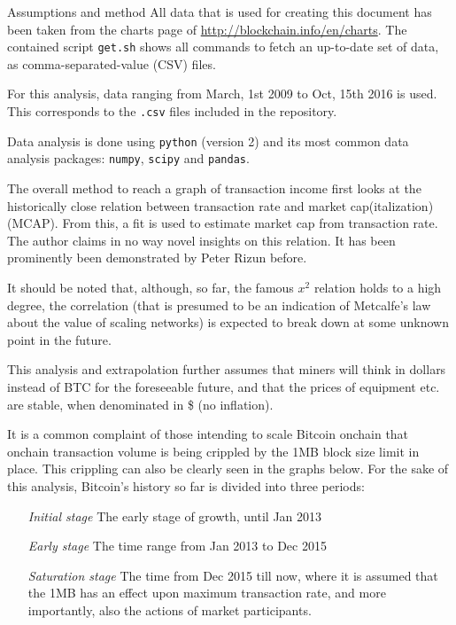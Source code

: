 \documentclass{article}
\begin{document}
\begin{section}{Assumptions and method}
  All data that is used for creating this document has been taken from the
  charts page of \url{http://blockchain.info/en/charts}. The contained script
  \texttt{get.sh} shows all commands to fetch an up-to-date set of data, as
  comma-separated-value (CSV) files.

  For this analysis, data ranging from March, 1st 2009 to Oct, 15th 2016 is
  used. This corresponds to the \texttt{.csv} files included in the
  repository.

  Data analysis is done using \texttt{python} (version 2) and its most common
  data analysis packages: \texttt{numpy}, \texttt{scipy} and \texttt{pandas}.
  
  The overall method to reach a graph of transaction income first looks at the
  historically close relation between transaction rate and market
  cap(italization) (MCAP). From this, a fit is used to estimate market cap
  from transaction rate. The author claims in no way novel insights on this
  relation. It has been prominently been demonstrated by Peter Rizun before.
  
  It should be noted that, although, so far, the famous $x^2$ relation holds
  to a high degree, the correlation (that is presumed to be an indication of
  Metcalfe's law about the value of scaling networks) is expected to break
  down at some unknown point in the future.
  
  This analysis and extrapolation further assumes that miners will think in
  dollars instead of BTC for the foreseeable future, and that the prices of
  equipment etc. are stable, when denominated in \$ (no inflation).
  
  It is a common complaint of those intending to scale Bitcoin onchain that
  onchain transaction volume is being crippled by the 1MB block size limit in
  place. This crippling can also be clearly seen in the graphs below. For the
  sake of this analysis, Bitcoin's history so far is divided into three periods:

  \begin{itemize}
  \item[\emph{Initial stage}]The early stage of growth, until Jan 2013
  \item[\emph{Early stage}]The time range from Jan 2013 to Dec 2015
  \item[\emph{Saturation stage}]The time from Dec 2015 till now, where it is assumed
    that the 1MB has an effect upon maximum transaction rate, and more
    importantly, also the actions of market participants.
    \end{itemize}
  


\end{section}
\end{document}
